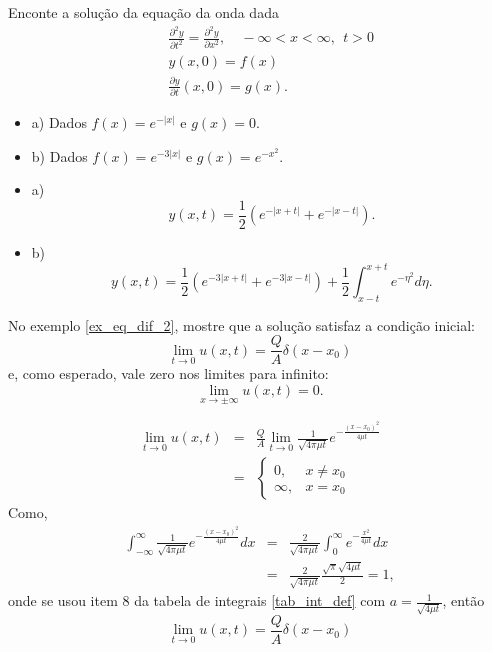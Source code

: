 \begin{Exercise} Enconte a solução da equação da onda dada
\begin{eqnarray*}
&&\frac{\partial^2 y}{\partial t^2}=\frac{\partial^2
y}{\partial x^2},\quad -\infty<x<\infty,\ \ t>0\\
&&y(x,0)=f(x)\\
&&\frac{\partial y}{\partial t}(x,0)=g(x).
\end{eqnarray*}
\begin{itemize}
 \item a) Dados $f(x)=e^{-|x|}$ e $g(x)=0$.
  \item b) Dados $f(x)=e^{-3|x|}$ e $g(x)=e^{-x^2}$.
\end{itemize}

\end{Exercise}
\begin{Answer}

\begin{itemize}
 \item a) 
 \begin{equation*}
y(x,t)=\frac{1}{2} \left( e^{-|x+t|}+e^{-|x-t|}
\right).
\end{equation*}
\item b) 
 \begin{equation*}
y(x,t)=\frac{1}{2} \left(  e^{-3|x+t|}+e^{-3|x-t|}
\right)+\frac{1}{2}\int_{x-t}^{x+t}e^{-\eta^2}d\eta.
\end{equation*}
\end{itemize}

\end{Answer}


\begin{Exercise}No exemplo \ref{ex_eq_dif_2}, mostre que a solução satisfaz a condição inicial: 
$$
\lim_{t\to 0}u(x,t)=\frac{Q}{A}\delta(x-x_0)
$$
e, como esperado, vale zero nos limites para infinito:
$$
\lim_{x\to\pm\infty}u(x,t)=0.
$$
\end{Exercise}
\begin{Answer}
\begin{eqnarray*}
\lim_{t\to 0} u(x,t)&=&\frac{Q}{A}\lim_{t\to 0} \frac{1}{\sqrt{4\pi \mu t}}e^{-\frac{(x-x_0)^2}{4\mu t}}\\
&=&\left\{\begin{array}{ll}0,&x\neq x_0\\ \infty, &x=x_0\end{array}\right.
\end{eqnarray*}
Como,
\begin{eqnarray*}
\int_{-\infty}^\infty\frac{1}{\sqrt{4\pi \mu t}}e^{-\frac{(x-x_0)^2}{4\mu t}}dx&=&\frac{2}{\sqrt{4\pi \mu t}}\int_{0}^\infty e^{-\frac{x^2}{4\mu t}}dx\\
&=&\frac{2}{\sqrt{4\pi \mu t}}\frac{\sqrt{\pi} \sqrt{4\mu t}}{2}=1,
\end{eqnarray*}
onde se usou item 8 da tabela de integrais \ref{tab_int_def} com $a=\frac{1}{\sqrt{4\mu t}}$, então
$$
\lim_{t\to 0} u(x,t)=\frac{Q}{A} \delta(x-x_0)
$$
\end{Answer}




